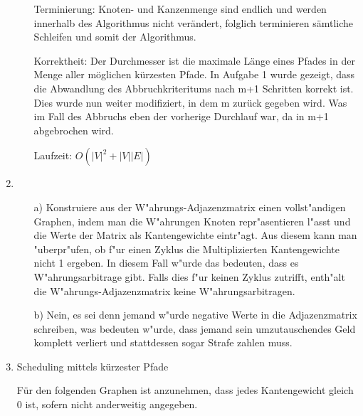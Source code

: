 \documentclass{article}
\begin{document}
\begin{enumerate}[\bfseries1.]
\begin{enumerate}
Terminierung: Knoten- und Kanzenmenge sind endlich und werden innerhalb des
Algorithmus nicht verändert, folglich terminieren sämtliche Schleifen und somit
der Algorithmus.

Korrektheit: Der Durchmesser ist die maximale Länge eines Pfades in der Menge
aller möglichen kürzesten Pfade. In Aufgabe 1 wurde gezeigt, dass die Abwandlung
des Abbruchkriteritums nach m+1 Schritten korrekt ist. Dies wurde nun weiter
modifiziert, in dem m zurück gegeben wird. Was im Fall des Abbruchs eben der
vorherige Durchlauf war, da in m+1 abgebrochen wird.

Laufzeit: $O(|V|^2 + |V||E|)$
    \end{enumerate}

\item 
    \begin{enumerate}
        \item[a)]
            Konstruiere aus der W"ahrungs-Adjazenzmatrix einen vollst"andigen Graphen,
            indem man die W"ahrungen Knoten repr"asentieren l"asst und die Werte der Matrix als Kantengewichte
            eintr"agt. Aus diesem kann man "uberpr"ufen, ob f"ur einen Zyklus die Multiplizierten Kantengewichte
            nicht 1 ergeben. In diesem Fall w"urde das bedeuten, dass es W"ahrungsarbitrage gibt.
            Falls dies f"ur keinen Zyklus zutrifft, enth"alt die W"ahrungs-Adjazenzmatrix keine W"ahrungsarbitragen.
        \item[b)]
            Nein, es sei denn jemand w"urde negative Werte in die Adjazenzmatrix schreiben, was bedeuten w"urde, dass jemand sein umzutauschendes Geld komplett verliert und stattdessen sogar Strafe zahlen muss.
    \end{enumerate}

\item Scheduling mittels kürzester Pfade

Für den folgenden Graphen ist anzunehmen, dass jedes Kantengewicht gleich 0 ist,
sofern nicht anderweitig angegeben.

\end{enumerate}
\end{document}
